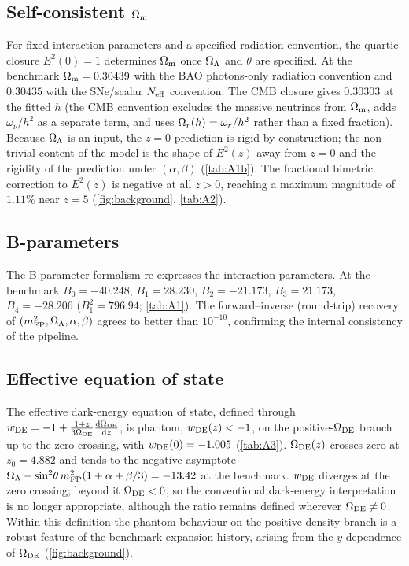 \subsection[Self-consistent Omega m]{Self-consistent $\Omega_{\mathrm m}$}\label{sec:Om}
For fixed interaction parameters and a specified radiation convention, the quartic closure $E^2(0)=1$ determines $\Omega_{\mathrm m}$ once $\Omega_{\Lambda}$ and $\theta$ are specified. At the benchmark $\Omega_{\mathrm m}=0.30439$ with the BAO photons-only radiation convention and $0.30435$ with the SNe/scalar $N_{\rm eff}$ convention. The CMB closure gives $0.30303$ at the fitted $h$ (the CMB convention excludes the massive neutrinos from $\Omega_{\mathrm m}$, adds $\omega_\nu/h^2$ as a separate term, and uses $\Omega_{r}(h)=\omega_r/h^2$ rather than a fixed fraction).
Because $\Omega_{\Lambda}$ is an input, the $z=0$ prediction is rigid by construction; the non-trivial content of the model is the shape of $E^2(z)$ away from $z=0$ and the rigidity of the prediction under $(\alpha,\beta)$ (\cref{tab:A1b}). The fractional bimetric correction to $E^2(z)$ is negative at all $z>0$, reaching a maximum magnitude of $1.11\%$ near $z=5$ (\cref{fig:background}, \cref{tab:A2}).

\subsection{B-parameters}
The B-parameter formalism \citep[][Eq.~3.4]{Hogas2021} re-expresses the interaction parameters. At the benchmark $B_0=-40.248$, $B_1=28.230$, $B_2=-21.173$, $B_3=21.173$, $B_4=-28.206$ ($B_1^2=796.94$; \cref{tab:A1}). The forward--inverse (round-trip) recovery of $(m_{\mathrm{FP}}^2,\Omega_{\Lambda},\alpha,\beta)$ agrees to better than $10^{-10}$, confirming the internal consistency of the pipeline.

\subsection{Effective equation of state}
The effective dark-energy equation of state, defined through $w_{\rm DE}=-1+\frac{1+z}{3\Omega_{\mathrm{DE}}}\frac{\mathrm{d}\Omega_{\mathrm{DE}}}{\mathrm{d} z}$, is phantom, $w_{\rm DE}(z)<-1$, on the positive-$\Omega_{\mathrm{DE}}$ branch up to the zero crossing, with $w_{\rm DE}(0)=-1.005$ (\cref{tab:A3}). $\Omega_{\mathrm{DE}}(z)$ crosses zero at $z_0=4.882$ and tends to the negative asymptote $\Omega_{\Lambda}-\sin^2\!\theta\,m_{\mathrm{FP}}^2(1+\alpha+\beta/3)=-13.42$ at the benchmark. $w_{\rm DE}$ diverges at the zero crossing; beyond it $\Omega_{\mathrm{DE}}<0$, so the conventional dark-energy interpretation is no longer appropriate, although the ratio remains defined wherever $\Omega_{\mathrm{DE}}\neq0$. Within this definition the phantom behaviour on the positive-density branch is a robust feature of the benchmark expansion history, arising from the $y$-dependence of $\Omega_{\mathrm{DE}}$ (\cref{fig:background}).

